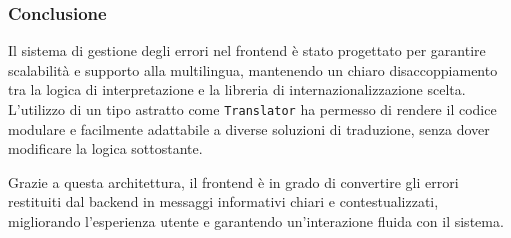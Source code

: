 \subsubsection{Conclusione}
Il sistema di gestione degli errori nel frontend è stato progettato per garantire scalabilità e supporto alla multilingua, mantenendo un chiaro disaccoppiamento tra la logica di interpretazione e la libreria di internazionalizzazione scelta. L’utilizzo di un tipo astratto come \texttt{Translator} ha permesso di rendere il codice modulare e facilmente adattabile a diverse soluzioni di traduzione, senza dover modificare la logica sottostante.

Grazie a questa architettura, il frontend è in grado di convertire gli errori restituiti dal backend in messaggi informativi chiari e contestualizzati, migliorando l’esperienza utente e garantendo un’interazione fluida con il sistema.
